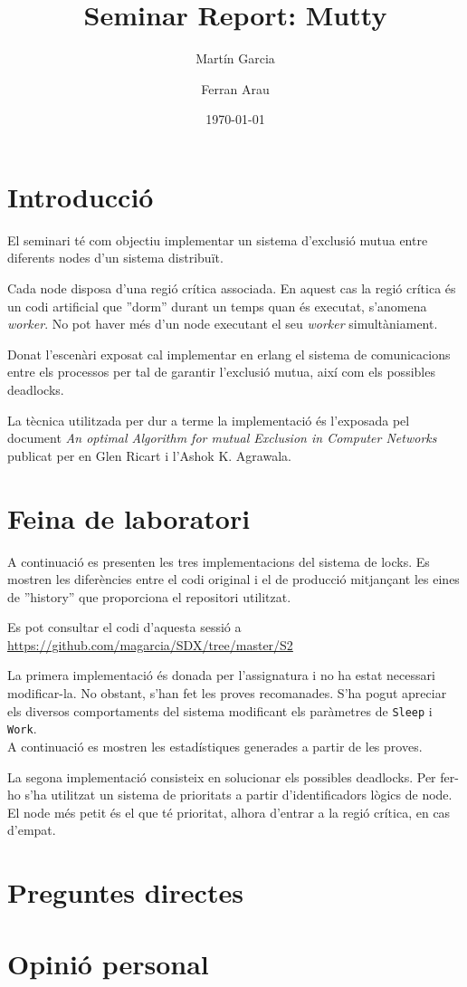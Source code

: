 \documentclass[a4paper, 11pt]{article}
\title{Seminar Report: Mutty}
\author{Martín Garcia \and Ferran Arau}
\date{\today{}}
\begin{document}
\maketitle

\section{Introducció}


El seminari té com objectiu implementar un sistema d'exclusió mutua entre diferents nodes d'un sistema distribuït. 

Cada node disposa d'una regió crítica associada. En aquest cas la regió crítica és un codi artificial que ''dorm'' durant un temps quan és executat, s'anomena \textit{worker}. No pot haver més d'un node executant el seu \textit{worker} simultàniament. 

Donat l'escenàri exposat cal implementar en erlang el sistema de comunicacions entre els processos per tal de garantir l'exclusió mutua, així com els possibles deadlocks. 

La tècnica utilitzada per dur a terme la implementació és l'exposada pel document \textit{An optimal Algorithm for mutual Exclusion in Computer Networks} publicat per en Glen Ricart i l’Ashok K. Agrawala.

\section{Feina de laboratori}

A continuació es presenten les tres implementacions del sistema de locks. Es
mostren les diferències entre el codi original i el de producció mitjançant les
eines de ''history'' que proporciona el repositori utilitzat. 

Es pot consultar el codi d'aquesta sessió a
\url{https://github.com/magarcia/SDX/tree/master/S2}

La primera implementació és donada per l'assignatura i no ha estat necessari modificar-la. No obstant, s'han fet les proves recomanades. S'ha pogut apreciar els diversos comportaments del sistema modificant els paràmetres de \texttt{Sleep} i \texttt{Work}. \\ 
A continuació es mostren les estadístiques generades a partir de les proves.

La segona implementació consisteix en solucionar els possibles deadlocks. Per fer-ho s'ha utilitzat un sistema de prioritats a partir d'identificadors lògics de node. El node més petit és el que té prioritat, alhora d'entrar a la regió crítica, en cas d'empat. 



\section{Preguntes directes}


\section{Opinió personal}
\end{document}
